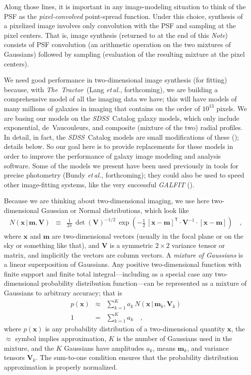\documentclass[12pt,pdftex,preprint]{aastex}
\newcommand{\foreign}[1]{\textit{#1}}
\newcommand{\etal}{\foreign{et\,al.}}
\newcommand{\documentname}{\textsl{Note}}
\newcommand{\project}[1]{\textsl{#1}}
\newcommand{\thetractor}{\project{The~Tractor}}
\newcommand{\sdss}{\project{SDSS}}
\newcommand{\tmatrix}[1]{\boldsymbol{#1}}
\newcommand{\inverse}[1]{{#1}^{-1}}
\newcommand{\transpose}[1]{{#1}^{\mathsf T}}
\newcommand{\tvector}[1]{\boldsymbol{#1}}
\newcommand{\pos}{\tvector{x}}
\newcommand{\mean}{\tvector{m}}
\newcommand{\var}{\tmatrix{V}\!}
\newcommand{\normal}{N}
\newcommand{\given}{\,|\,}
\begin{document}
Along those lines, it is important in any image-modeling situation to
think of the PSF as the \emph{pixel-convolved} point-spread function.
Under this choice, synthesis of a pixelized image involves only
convolution with the PSF and sampling at the pixel centers.  That is,
image synthesis (returned to at the end of this \documentname)
consists of PSF convolution (an arithmetic operation on the two
mixtures of Gaussians) followed by sampling (evaluation of the
resulting mixture at the pixel centers).

We need good performance in two-dimensional image synthesis (for
fitting) because, with \thetractor\ (Lang \etal, forthcoming), we are
building a comprehensive model of all the imaging data we have; this
will have models of many millions of galaxies in imaging that contains
on the order of $10^{13}$ pixels.  We are basing our models on the
\sdss\ Catalog galaxy models, which only include exponential,
de~Vaucouleurs, and composite (mixture of the two) radial profiles.
In detail, in fact, the \sdss\ Catalog models are small modifications
of these (\citealt{lupton}); details below.  So our goal here is to
provide replacements for these models in order to improve the
performance of galaxy image modeling and analysis software.  Some of
the models we present have been used previously in tools for precise
photometry (Bundy \etal, forthcoming); they could also be used to
speed other image-fitting systems, like the very successful
\project{GALFIT} (\citealt{galfit}).

Because we are thinking about two-dimensional imaging, we use here
two-dimensional Gaussian or Normal distributions, which look like
\begin{eqnarray}\displaystyle
\normal(\pos\given\mean,\var) &\equiv& \frac{1}{2\pi}\,\det(\var)^{-1/2}\,\exp(-\frac{1}{2}\,\transpose{[\pos-\mean]}\cdot\inverse{\var}\cdot[\pos-\mean])
\quad ,
\end{eqnarray}
where $\pos$ and $\mean$ are two-dimensional vectors (usually in the
focal plane or on the sky or something like that), and $\var$ is a
symmetric $2\times 2$ variance tensor or matrix, and implicitly the
vectors are column vectors.  A \emph{mixture of Gaussians} is a linear
superposition of Gaussians.  Any positive two-dimensional function
with finite support and finite total integral---including as a special
case any two-dimensional probability distribution function---can be
represented as a mixture of Gaussians to arbitrary accuracy; that is
\begin{eqnarray}
p(\pos) &\approx& \sum_{k=1}^K a_k\,\normal(\pos\given\mean_k,\var_k)
\\
1 &=& \sum_{k=1}^K a_k
\quad ,
\end{eqnarray}
where $p(\pos)$ is any probability distribution of a two-dimensional
quantity $\pos$, the $\approx$ symbol implies approximation, $K$ is
the number of Gaussians used in the mixture, and the $K$ Gaussians
have amplitudes $a_k$, means $\mean_k$, and variance tensors $\var_k$.
The sum-to-one condition ensures that the probability distribution
approximation is properly normalized.
\end{document}
